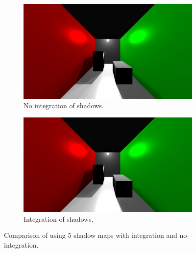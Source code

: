 \begin{figure}
	\centering
	\begin{subfigure}[b]{1.0\textwidth}
		\includegraphics[width=\textwidth]{AltResults/noIntegration.jpg}
		\caption{No integration of shadows.}
	\end{subfigure}
	\centering
	\begin{subfigure}[b]{1.0\textwidth}
		\includegraphics[width=\textwidth]{AltResults/integration.jpg}
		\caption{Integration of shadows.}
	\end{subfigure}
	\caption{Comparison of using 5 shadow maps with integration and no integration.}\label{fig:intCompare}
\end{figure}

